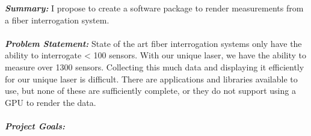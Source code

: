 \documentclass[10pt,letterpaper]{article}
\begin{document}

\textbf{\textit{Summary:}} I propose to create a software package to render measurements from a fiber interrogation system.
\\
\\
\textbf{\textit{Problem Statement:}} State of the art fiber interrogation systems only have the ability to interrogate < 100 sensors.  With our unique laser, we have the ability to measure over 1300 sensors.  Collecting this much data and displaying it efficiently for our unique laser is difficult.  There are applications and libraries available to use, but none of these are sufficiently complete, or they do not support using a GPU to render the data.
\\
\\
\textbf{\textit{Project Goals:}}
\end{document}
